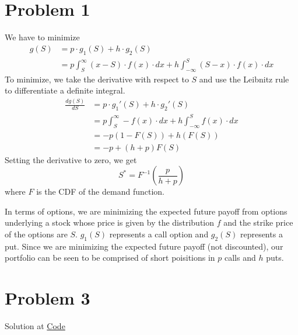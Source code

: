 \documentclass[11pt]{article}
\begin{document}
\maketitle
\thispagestyle{first}

\section*{Problem 1}

We have to minimize 
\begin{align}
g(S)&=p \cdot g_1(S)+h \cdot g_2(S)\\
&= p\int_S^{\infty}(x-S) \cdot f(x) \cdot d x + h\int_{-\infty}^S(S-x) \cdot f(x) \cdot d x
\end{align}
To minimize, we take the derivative with respect to $S$ and use the Leibnitz rule to differentiate a definite integral.
\begin{align}
\frac{dg(S)}{dS}&=p \cdot g_1'(S)+h \cdot g_2'(S)\\
&= p\int_S^{\infty}- f(x) \cdot d x + h\int_{-\infty}^Sf(x) \cdot d x\\
&= -p(1-F(S)) + h(F(S))\\
&= -p + (h+p)F(S)
\end{align}
Setting the derivative to zero, we get 
$$
S^* = F^{-1}(\frac{p}{h+p})
$$
where $F$ is the CDF of the demand function.
\newline

In terms of options, we are minimizing the expected future payoff from options underlying a stock whose price is given by the distribution $f$ and the strike price of the options are $S$. $g_1(S)$ represents a call option and $g_2(S)$ represents a put. Since we are minimizing the expected future payoff (not discounted), our portfolio can be seen to be comprised of short poisitions in $p$ calls and $h$ puts.


\section*{Problem 3}
Solution at \href{https://github.com/MatthewWilsonThomas/CME241-RLForFinance/blob/master/Problem%20Sets/Assignment_5/Q3-OrderBookDynamics.py}{Code}
\end{document}
